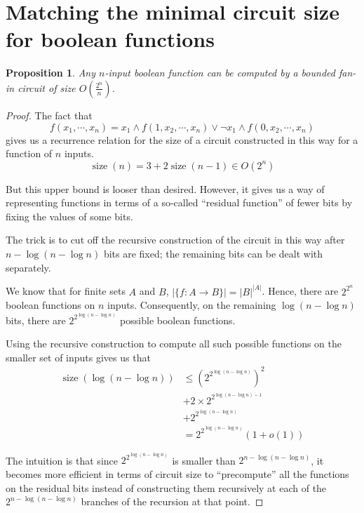 \documentclass[letterpaper,11pt]{article}
\newtheorem{proposition}{Proposition}
\DeclareMathOperator{\size}{size}
\begin{document}
\section*{Matching the minimal circuit size for boolean functions}

\begin{proposition}
    Any $n$-input boolean function can be computed by a bounded fan-in circuit
    of size $O\left(\frac{2^n}{n}\right)$.
\end{proposition}

\begin{proof}
    The fact that
    $$
    f(x_1, \cdots, x_n)
    = x_1 \land f(1, x_2, \cdots, x_n)
    \lor \neg x_1 \land f(0, x_2, \cdots, x_n)
    $$
    gives us a recurrence relation for the size of a circuit constructed in
    this way for a function of $n$ inputs.
    $$
    \size{(n)} = 3 + 2 \size{(n - 1)} \in O(2^n)
    $$

    But this upper bound is looser than desired. However, it gives us a way of
    representing functions in terms of a so-called ``residual function'' of
    fewer bits by fixing the values of some bits.

    The trick is to cut off the recursive construction of the circuit in this
    way after $n - \log{(n - \log n)}$ bits are fixed; the remaining bits can
    be dealt with separately.

    We know that for finite sets $A$ and $B$, $|\{f : A \to B\}| = |B|^{|A|}$.
    Hence, there are $2^{2^n}$ boolean functions on $n$ inputs. Consequently,
    on the remaining $\log{(n - \log n)}$ bits, there are
    $2^{2^{\log{(n - \log n)}}}$ possible boolean functions.

    Using the recursive construction to compute all such possible functions on
    the smaller set of inputs gives us that
    \begin{align*}
        \size{(\log{(n - \log n)})}
        &\leq \left(2^{2^{\log{(n - \log n)}}}\right)^2 \\
        &+ 2 \times 2^{2^{\log{(n - \log n)} - 1}} \\
        &+ 2^{2^{\log{(n - \log n)}}} \\
        &= 2^{2^{\log{(n - \log n)}}} (1 + o(1))
    \end{align*}

    The intuition is that since $2^{2^{\log{(n - \log n)}}}$ is smaller than
    $2^{n - \log{(n - \log n)}}$, it becomes more efficient in terms of circuit
    size to ``precompute'' all the functions on the residual bits instead of
    constructing them recursively at each of the $2^{n - \log{(n - \log n)}}$
    branches of the recursion at that point.


\end{proof}
\end{document}
